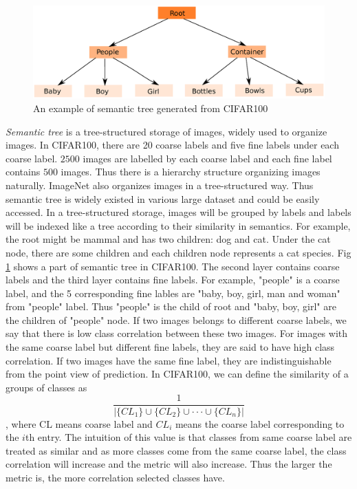 \documentclass[conference]{IEEEtran}
\begin{document}
\begin{spacing}{0.9}
\begin{figure}
\centering
  \includegraphics[scale=0.2]{semanticTree.ps}
\caption{An example of semantic tree generated from CIFAR100}
\label{fig:semanticTree}
\end{figure}

\textit{Semantic tree} is a  tree-structured storage of images, widely used to organize images. In CIFAR100, there are 20 coarse labels and five fine labels under each coarse label. $2500$ images are labelled by each coarse label and each fine label contains $500$ images. Thus there is a hierarchy structure organizing images naturally. ImageNet  \cite{deng2009imagenet, imagenet_cvpr09} also organizes images in a tree-structured way. Thus semantic tree is widely existed in various large dataset and could be easily accessed. In a tree-structured storage, images will be grouped by labels and labels will be indexed like a tree according to their similarity in semantics. For example, the root might be mammal and has two children: dog and cat. Under the cat node, there are some children and each children node represents a cat species. Fig \ref{fig:semanticTree} shows a part of semantic tree in CIFAR100. The second layer contains coarse labels and the third layer contains fine labels. For example, "people" is a coarse label, and the 5 corresponding fine lables are "baby, boy, girl, man and woman" from "people" label. Thus "people" is the child of root and "baby, boy, girl" are the children of "people" node.  If two images belongs to different coarse labels, we say that there is low class correlation between these two images. For images with the same coarse label but different fine labels, they are said to have high class correlation. If two images have the same fine label, they are indistinguishable from the point view of prediction. In CIFAR100, we can define the similarity of a groups of classes as 
\begin{equation}
    \frac{1}{|\{ CL_1  \} \cup \{ CL_2\} \cup \cdot \cdot \cdot  \cup  \{ CL_n\}  |}
\end{equation}
,
where CL means coarse label and $CL_i$ means the coarse label corresponding to the $i$th entry. The intuition of this value is that classes from same coarse label are treated as similar and as more classes come from the same coarse label, the class correlation will increase and the metric will also increase. Thus the larger the metric is, the more correlation selected classes have.


\end{spacing}
\end{document}
